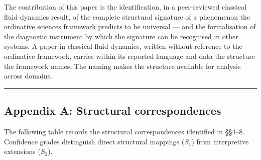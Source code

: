 \documentclass[
  11pt,
  a4paper,
]{article}
\begin{document}
The contribution of this paper is the identification, in a peer-reviewed
classical fluid-dynamics result, of the complete structural signature of
a phenomenon the ordinative sciences framework predicts to be universal
--- and the formalisation of the diagnostic instrument by which the
signature can be recognised in other systems. A paper in classical fluid
dynamics, written without reference to the ordinative framework, carries
within its reported language and data the structure the framework names.
The naming makes the structure available for analysis across domains.

\begin{center}\rule{0.5\linewidth}{0.5pt}\end{center}

\subsection{Appendix A: Structural
correspondences}\label{appendix-a-structural-correspondences}

The following table records the structural correspondences identified in
§§4--8. Confidence grades distinguish direct structural mappings
(\(S_1\)) from interpretive extensions (\(S_2\)).
\end{document}
